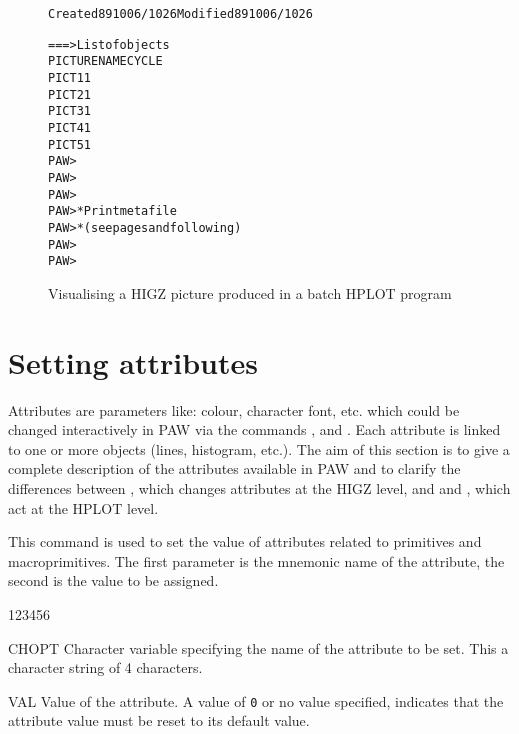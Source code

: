 \begin{figure}
\begin{minipage}[t]{.49\textwidth}
\begin{alltt}
  Created 891006/1026  Modified 891006/1026
 
===> List of objects
    PICTURE  NAME                  CYCLE
       PICT1                        1
       PICT2                        1
       PICT3                        1
       PICT4                        1
       PICT5                        1
PAW > 
PAW > 
PAW > 
PAW > * Print metafile
PAW > *  {\rm (see pages \pageref{sec:H2HIGZP} and following)}
PAW > 
PAW > 
\end{alltt}

\begin{center}\mbox{}\end{center}
\end{minipage}

\caption{Visualising a HIGZ picture produced in a batch HPLOT program}
\label{fig:HIGZBAT}
\end{figure}

\newpage

\section{Setting attributes}

Attributes are parameters like: colour, character font, etc. which could be
changed interactively in PAW via the commands ,
 and . 
Each attribute is linked to one or more objects (lines, histogram, etc.). The
aim of this section is to give a complete description of the attributes 
available in PAW and to clarify the differences between , which
changes attributes at the HIGZ level, and and ,
which act at the HPLOT level.

\def\PAWchap{ }

This command is used to set the value of attributes related to primitives 
and macroprimitives. The first parameter is the mnemonic name of the attribute,
the second is the value to be assigned.

\begin{DLtt}{123456}
\item[CHOPT] Character variable specifying the name of the attribute to be set.
             This a character string of 4 characters.
\item[VAL]   Value of the attribute. A value of \texttt{0} or no value specified,
             indicates that the attribute value must be reset to its default
             value.
\end{DLtt}

